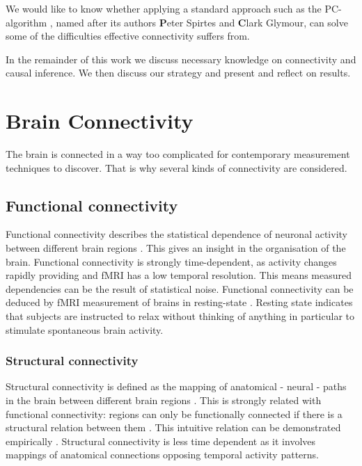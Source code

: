 \documentclass[a4paper, 10pt, english, onecolumn]{article}
\begin{document}
We would like to know whether applying a standard approach such as the PC-algorithm \cite{spirtes2000}, named after its authors \textbf{P}eter Spirtes and \textbf{C}lark Glymour, can solve some of the difficulties effective connectivity suffers from.

In the remainder of this work we discuss necessary knowledge on connectivity and causal inference.
We then discuss our strategy and present and reflect on results.

\section{Brain Connectivity}
The brain is connected in a way too complicated for contemporary measurement techniques to discover.
That is why several kinds of connectivity are considered.

\subsection{Functional connectivity}
Functional connectivity describes the statistical dependence of neuronal activity between different brain regions \cite{friston1993functional}.
This gives an insight in the organisation of the brain.
Functional connectivity is strongly time-dependent, as activity changes rapidly providing and fMRI has a low temporal resolution.
This means measured dependencies can be the result of statistical noise.
Functional connectivity can be deduced by fMRI measurement of brains in resting-state \cite{Lowe2000, doria2010, Bullmore2009}.
Resting state indicates that subjects are instructed to relax without thinking of anything in particular to stimulate spontaneous brain activity.

\subsubsection{Structural connectivity}
Structural connectivity is defined as the mapping of anatomical - neural - paths in the brain between different brain regions \cite{friston1994}.
This is strongly related with functional connectivity: regions can only be functionally connected if there is a structural relation between them \cite{cabral2012}.
This intuitive relation can be demonstrated empirically \cite{vandenheuvel2009}.
Structural connectivity is less time dependent as it involves mappings of anatomical connections opposing temporal activity patterns.
\end{document}
